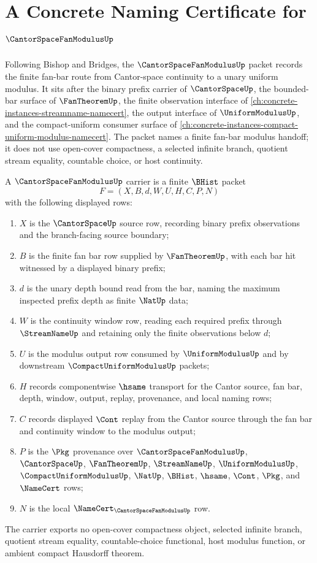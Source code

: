 \chapter{A Concrete Naming Certificate for $\CantorSpaceFanModulusUp$}
\label{ch:concrete-instances-cantor-space-fan-modulus-namecert}

Following Bishop and Bridges, the $\CantorSpaceFanModulusUp$ packet records the finite fan-bar route from Cantor-space continuity to a unary uniform modulus. It sits after the binary prefix carrier of $\CantorSpaceUp$, the bounded-bar surface of $\FanTheoremUp$, the finite observation interface of \autoref{ch:concrete-instances-streamname-namecert}, the output interface of $\UniformModulusUp$, and the compact-uniform consumer surface of \autoref{ch:concrete-instances-compact-uniform-modulus-namecert}. The packet names a finite fan-bar modulus handoff; it does not use open-cover compactness, a selected infinite branch, quotient stream equality, countable choice, or host continuity.

\begin{definition}
\label{def:cantor-space-fan-modulus-carrier}
A $\CantorSpaceFanModulusUp$ carrier is a finite $\BHist$ packet
$$
F=(X,B,d,W,U,H,C,P,N)
$$
with the following displayed rows:
\begin{enumerate}
\item $X$ is the $\CantorSpaceUp$ source row, recording binary prefix observations and the branch-facing source boundary;
\item $B$ is the finite fan bar row supplied by $\FanTheoremUp$, with each bar hit witnessed by a displayed binary prefix;
\item $d$ is the unary depth bound read from the bar, naming the maximum inspected prefix depth as finite $\NatUp$ data;
\item $W$ is the continuity window row, reading each required prefix through $\StreamNameUp$ and retaining only the finite observations below $d$;
\item $U$ is the modulus output row consumed by $\UniformModulusUp$ and by downstream $\CompactUniformModulusUp$ packets;
\item $H$ records componentwise $\hsame$ transport for the Cantor source, fan bar, depth, window, output, replay, provenance, and local naming rows;
\item $C$ records displayed $\Cont$ replay from the Cantor source through the fan bar and continuity window to the modulus output;
\item $P$ is the $\Pkg$ provenance over $\CantorSpaceFanModulusUp$, $\CantorSpaceUp$, $\FanTheoremUp$, $\StreamNameUp$, $\UniformModulusUp$, $\CompactUniformModulusUp$, $\NatUp$, $\BHist$, $\hsame$, $\Cont$, $\Pkg$, and $\NameCert$ rows;
\item $N$ is the local $\NameCert_{\CantorSpaceFanModulusUp}$ row.
\end{enumerate}
The carrier exports no open-cover compactness object, selected infinite branch, quotient stream equality, countable-choice functional, host modulus function, or ambient compact Hausdorff theorem.
\end{definition}

